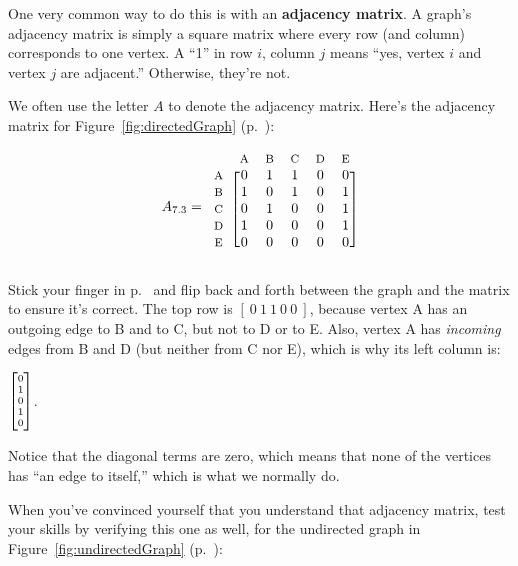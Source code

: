 One very common way to do this is with an \textbf{adjacency matrix}. A graph's
adjacency matrix is simply a square matrix where every row (and column)
corresponds to one vertex. A ``1'' in row $i$, column $j$ means ``yes, vertex
$i$ and vertex $j$ are adjacent.'' Otherwise, they're not.

We often use the letter $A$ to denote the adjacency matrix. Here's the
adjacency matrix for Figure~\ref{fig:directedGraph}
(p.~\pageref{fig:directedGraph}):

\label{firstAdjacencyMatrix}
\[
A_{7.3} = 
\begin{blockarray}{cccccc}
& {\footnotesize\textrm{A}} & {\footnotesize\textrm{B}} & {\footnotesize\textrm{C}} & {\footnotesize\textrm{D}} & {\footnotesize\textrm{E}} \\
\begin{block}{c[ccccc]}
{\footnotesize\textrm{A}} & 0 & 1 & 1 & 0 & 0 \\
{\footnotesize\textrm{B}} & 1 & 0 & 1 & 0 & 1 \\
{\footnotesize\textrm{C}} & 0 & 1 & 0 & 0 & 1 \\
{\footnotesize\textrm{D}} & 1 & 0 & 0 & 0 & 1 \\
{\footnotesize\textrm{E}} & 0 & 0 & 0 & 0 & 0 \\
\end{block}
\end{blockarray}
\]

Stick your finger in p.~\pageref{fig:directedGraph} and flip back and forth
between the graph and the matrix to ensure it's correct. The top row is $[\ 0\
1\ 1\ 0\ 0\ ]$, because vertex A has an outgoing edge to B and to C, but not to
D or to E. Also, vertex A has \textit{incoming} edges from B and D (but neither
from C nor E), which is why its left column is:

\vspace{-.15in}
\begin{center}
${\scriptsize \begin{bmatrix} 0
\\ 1 \\ 0 \\ 1 \\ 0 \end{bmatrix}}$.
\end{center}

Notice that the diagonal terms are zero, which means that none of the vertices
has ``an edge to itself,'' which is what we normally do.

When you've convinced yourself that you understand that adjacency matrix, test
your skills by verifying this one as well, for the undirected graph in 
Figure~\ref{fig:undirectedGraph} (p.~\pageref{fig:undirectedGraph}):

